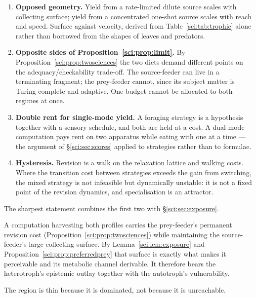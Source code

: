 \begin{enumerate}
\item \textbf{Opposed geometry.} Yield from a rate-limited dilute source scales with collecting
surface; yield from a concentrated one-shot source scales with reach and speed. Surface against
velocity, derived from Table~\ref{sci:tab:trophic} alone rather than borrowed from the shapes of leaves
and predators.

\item \textbf{Opposite sides of Proposition~\ref{sci:prop:limit}.} By Proposition~\ref{sci:prop:twosciences}
the two diets demand different points on the adequacy/checkability trade-off. The source-feeder can
live in a terminating fragment; the prey-feeder cannot, since its subject matter is Turing complete
and adaptive. One budget cannot be allocated to both regimes at once.

\item \textbf{Double rent for single-mode yield.} A foraging strategy is a hypothesis together with a
sensory schedule, and both are held at a cost. A dual-mode computation pays rent on two apparatus
while eating with one at a time --- the argument of \S\ref{sci:sec:scores} applied to strategies rather
than to formulae.

\item \textbf{Hysteresis.} Revision is a walk on the relaxation lattice and walking costs. Where the
transition cost between strategies exceeds the gain from switching, the mixed strategy is not
infeasible but dynamically unstable: it is not a fixed point of the revision dynamics, and
specialisation is an attractor.
\end{enumerate}

The sharpest statement combines the first two with \S\ref{sci:sec:exposure}.

\begin{proposition}
\label{sci:prop:worstofboth}
A computation harvesting both profiles carries the prey-feeder's permanent revision cost
(Proposition~\ref{sci:prop:twosciences}) while maintaining the source-feeder's large collecting surface.
By Lemma~\ref{sci:lem:exposure} and Proposition~\ref{sci:prop:preferredprey} that surface is exactly what makes
it perceivable and its metabolic channel derivable. It therefore bears the heterotroph's epistemic
outlay together with the autotroph's vulnerability.
\end{proposition}

The region is thin because it is dominated, not because it is unreachable.

